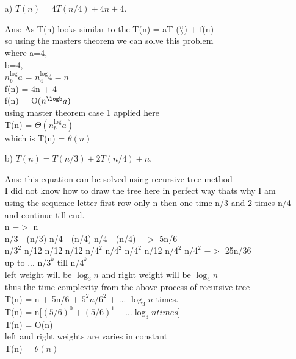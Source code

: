 \documentclass[10pt,letterpaper]{article}
\begin{document}
\begin{itemize}
\item[{a)}]  $T (n) = 4T (n/4) + 4n + 4$. 
\item[Ans: ] As T(n) looks similar to the T(n) = aT ($\frac{n}{b}$) + f(n)\\
so using the masters theorem we can solve this problem\\
where a=4,\\
b=4,\\
$n^\log_{b} a$ = $n^\log_{4} 4 = n$\\
f(n) = 4n + 4\\
f(n) = O($n^\logb a)$\\
using master theorem case 1 applied here \\
T(n) = $\Theta(n^\log_{b} a)$\\
which is T(n) = $\theta(n)$\\

\item[{b)}] $T(n) = T(n/3) + 2T(n/4) + n$.
\item[Ans: ] this equation can be solved using recursive tree method\\
I did not know how to draw the tree here in perfect way thats why I am using the sequence letter first row only n then one time n/3 and 2 times n/4 and continue till end.\\

n $->$ n\\
n/3 - (n/3) n/4 - (n/4) n/4 - (n/4) $->$ 5n/6\\
n/$3^2$ n/12 n/12 n/12 n/$4^2$ n/$4^2$ n/$4^2$ n/12 n/$4^2$ n/$4^2$ $->$ 25n/36\\
up to ... n/$3^k$ till n/$4^k$\\

left weight will be $\log_{3} n$ and right weight will be $\log_{4} n$\\
thus the time complexity from the above process of recursive tree \\
T(n) = n + 5n/6 + $5^2n/6^2$ + ... $\log_{3} n $ times.\\
T(n) = n[$(5/6)^0+(5/6)^1+...\log_{3}n times$]\\
T(n) = O(n) \\
left and right weights are varies in constant \\
T(n) = $\theta(n)$\\


\end{itemize}
\end{document}

